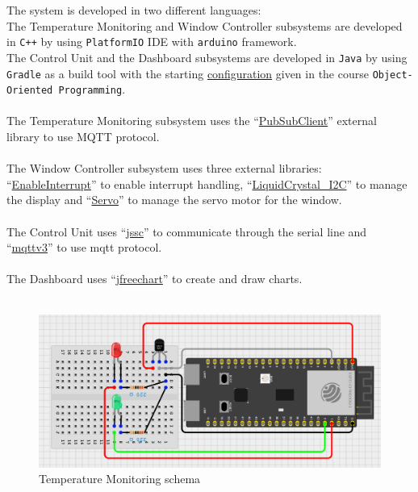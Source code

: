 \documentclass[a4paper,12pt]{report}
\begin{document}
    The system is developed in two different languages:\\
    The Temperature Monitoring and Window Controller subsystems are developed in \texttt{C++} by using \texttt{PlatformIO} IDE with 
    \texttt{arduino} framework.\\
    The Control Unit and the Dashboard subsystems are developed in \texttt{Java} by using \texttt{Gradle} as a build tool with the starting 
    \href{https://github.com/unibo-oop/sample-gradle-project}{configuration} given in the course \texttt{Object-Oriented Programming}. \\\\
    The Temperature Monitoring subsystem uses the ``\href{https://github.com/knolleary/pubsubclient}{PubSubClient}'' external library 
    to use MQTT protocol.\\\\
    The Window Controller subsystem uses three external libraries: ``\href{https://github.com/GreyGnome/EnableInterrupt}{EnableInterrupt}'' 
    to enable interrupt handling, 
    ``\href{https://github.com/johnrickman/LiquidCrystal_I2C}{LiquidCrystal\_I2C}'' to manage the display and 
    ``\href{https://docs.arduino.cc/libraries/servo/}{Servo}'' to manage the servo motor for the window.\\\\
    The Control Unit uses ``\href{https://mvnrepository.com/artifact/io.github.java-native/jssc/2.9.6}{jssc}'' to communicate through 
    the serial line and ``\href{https://mvnrepository.com/artifact/org.eclipse.paho/org.eclipse.paho.client.mqttv3/1.2.5}{mqttv3}'' 
    to use mqtt protocol.\\\\
    The Dashboard uses ``\href{https://mvnrepository.com/artifact/org.jfree/jfreechart/1.5.0}{jfreechart}'' to create and draw charts.\\\\

    \begin{figure}[H]
        \centering{}
            \includegraphics[width=\textwidth]{report/img/Assignment-03_SMT-Temperature-Subsystem.png}
        \caption{Temperature Monitoring schema}
        \label{img:temperature_schema}
    \end{figure}
\end{document}
